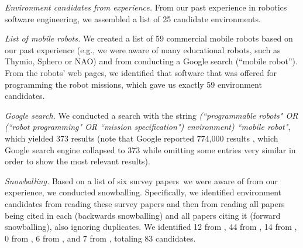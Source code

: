 \emph{Environment candidates from experience.} From our past experience in robotics software engineering, we assembled a list of 25 candidate environments.

\emph{List of mobile robots.} We created a list of 59 commercial mobile robots based on our past experience (e.g., we were aware of many educational robots, such as Thymio, Sphero or NAO) and from conducting a Google search (``mobile robot'').
From the robots' web pages, we identified that software that was offered for programming the robot missions, which gave us exactly 59 environment candidates.

\emph{Google search.} We conducted a search with the string \emph{(``programmable robots" OR (``robot programming" OR ``mission specification") environment) ``mobile robot"}, which yielded 373 results (note that Google reported 774,000 results%
, which Google search engine collapsed to 373 %
while omitting some entries very similar in order to show the most relevant results).


\emph{ Snowballing.} Based on a list of six survey papers\,\cite{Biggs2003,Bravo2018,Jost2015,Luckcuck2018,Nordmann2016a,Hentout2017} we were aware of from our experience, we conducted snowballing. Specifically, we identified environment candidates from reading these survey papers and then from reading all papers being cited in each (backwards snowballing) and all papers citing it (forward snowballing), also ignoring duplicates. We identified 12 from \citet{Biggs2003}, 44 from \citet{Bravo2018}, 14 from \citet{Jost2015}, 0 from \citet{Luckcuck2018}, 6 from \citet{Nordmann2016a}, and 7 from \citet{Hentout2017}, totaling 83 candidates.

